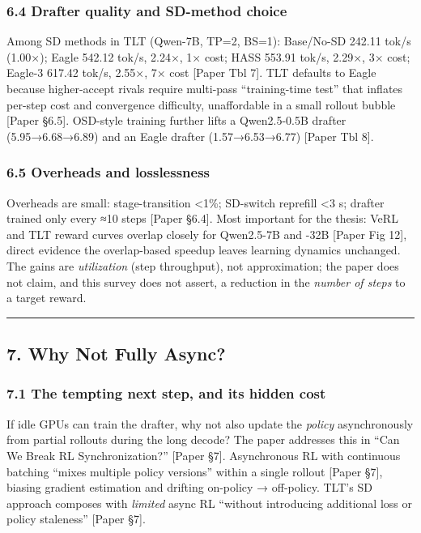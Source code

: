 \documentclass[
  11pt,
  letterpaper,
]{article}
\begin{document}
\subsubsection{6.4 Drafter quality and SD-method
choice}\label{drafter-quality-and-sd-method-choice}

Among SD methods in TLT (Qwen-7B, TP=2, BS=1): Base/No-SD 242.11 tok/s
(1.00×); Eagle 542.12 tok/s, 2.24×, 1× cost; HASS 553.91 tok/s, 2.29×,
3× cost; Eagle-3 617.42 tok/s, 2.55×, 7× cost {[}Paper Tbl 7{]}. TLT
defaults to Eagle because higher-accept rivals require multi-pass
``training-time test'' that inflates per-step cost and convergence
difficulty, unaffordable in a small rollout bubble {[}Paper §6.5{]}.
OSD-style training further lifts a Qwen2.5-0.5B drafter (5.95→6.68→6.89)
and an Eagle drafter (1.57→6.53→6.77) {[}Paper Tbl 8{]}.

\subsubsection{6.5 Overheads and
losslessness}\label{overheads-and-losslessness}

Overheads are small: stage-transition \textless1\%; SD-switch reprefill
\textless3 s; drafter trained only every ≈10 steps {[}Paper §6.4{]}.
Most important for the thesis: VeRL and TLT reward curves overlap
closely for Qwen2.5-7B and -32B {[}Paper Fig 12{]}, direct evidence the
overlap-based speedup leaves learning dynamics unchanged. The gains are
\emph{utilization} (step throughput), not approximation; the paper does
not claim, and this survey does not assert, a reduction in the
\emph{number of steps} to a target reward.

\begin{center}\rule{0.5\linewidth}{0.5pt}\end{center}

\subsection{7. Why Not Fully Async?}\label{why-not-fully-async}

\subsubsection{7.1 The tempting next step, and its hidden
cost}\label{the-tempting-next-step-and-its-hidden-cost}

If idle GPUs can train the drafter, why not also update the
\emph{policy} asynchronously from partial rollouts during the long
decode? The paper addresses this in ``Can We Break RL Synchronization?''
{[}Paper §7{]}. Asynchronous RL with continuous batching ``mixes
multiple policy versions'' within a single rollout {[}Paper §7{]},
biasing gradient estimation and drifting on-policy → off-policy. TLT's
SD approach composes with \emph{limited} async RL ``without introducing
additional loss or policy staleness'' {[}Paper §7{]}.
\end{document}

